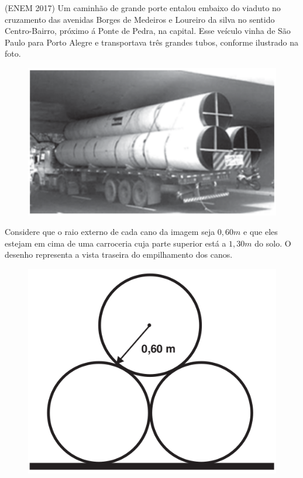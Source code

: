 \begin{multicols*}{2}
    \execnum (ENEM 2017) Um caminhão de grande porte entalou embaixo do viaduto no 
    cruzamento das avenidas Borges de Medeiros e Loureiro da silva no sentido 
    Centro-Bairro, próximo á Ponte de Pedra, na capital. Esse veículo vinha de 
    São Paulo para Porto Alegre e transportava três grandes tubos, conforme
     ilustrado na foto.  

     \begin{figure}[H]
        \centering
        \includegraphics[width=0.75\columnwidth]{assets/enem2017-157.png}
    \end{figure}

    Considere que o raio externo de cada cano da imagem seja $0,60m$ e que eles 
    estejam em cima de uma carroceria cuja parte superior está a $1,30m$ do solo.
    O desenho representa a vista traseira do empilhamento dos canos.
    
    \begin{figure}[H]
        \centering
        \includegraphics[width=0.75\columnwidth]{assets/enem2017-157-2.png}
    \end{figure}


\end{multicols*}
